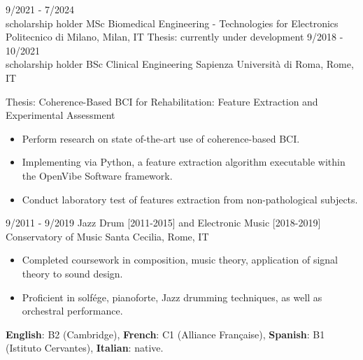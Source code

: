 \documentclass[9pt]{developercv} %
\begin{document}
\vspace{-15 pt}
\begin{entrylist}
    \entry
		{9/2021 - 7/2024 \\\footnotesize{scholarship holder}}
		{MSc Biomedical Engineering - Technologies for Electronics }
		{Politecnico di Milano, Milan, IT}
		{Thesis: currently under development}
    \entry
		{9/2018 - 10/2021 \\\footnotesize{scholarship holder}}
		{BSc Clinical Engineering}
		{Sapienza Università di Roma, Rome, IT}
		{Thesis: Coherence-Based BCI for Rehabilitation: Feature Extraction and Experimental Assessment
   \begin{itemize}[noitemsep,topsep=0pt,parsep=0pt,partopsep=0pt, leftmargin= 10pt]
            \item Perform research on state of-the-art use of coherence-based BCI. 
            \item Implementing via Python, a feature extraction algorithm executable within the OpenVibe Software framework.
            \item Conduct laboratory test of features extraction from non-pathological subjects.

        \end{itemize} 
             }
	\entry
		{9/2011 - 9/2019}
		{Jazz Drum [2011-2015] and Electronic Music [2018-2019]}
		{Conservatory of Music Santa Cecilia, Rome, IT}
		{ \begin{itemize}[noitemsep,topsep=0pt,parsep=0pt,partopsep=0pt, leftmargin= 10pt]
            \item Completed coursework in composition, music theory, application of signal theory to sound design. 
            \item Proficient in solfége, pianoforte, Jazz drumming techniques, as well as orchestral performance.
            \end{itemize}
        }
\end{entrylist}

\vspace{-15 pt}
    \vspace{-6pt}
    
    \hspace{26mm} \textbf{English}: B2 (Cambridge), \textbf{French}: C1 (Alliance Française), \textbf{Spanish}: B1 (Istituto Cervantes), \textbf{ Italian}: native.

\end{document}
